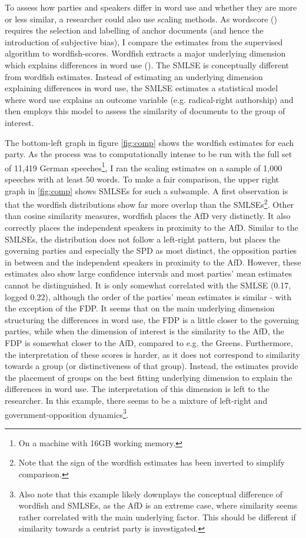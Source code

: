 \documentclass{article}
\begin{document}
To assess how parties and speakers differ in word use and whether they are more or less similar, a researcher could also use scaling methods. As wordscore (\cite{Laver2003}) requires the selection and labelling of anchor documents (and hence the introduction of subjective bias), I compare the estimates from the supervised algorithm to wordfish-scores. Wordfish extracts a major underlying dimension which explains differences in word use (\cite{Slapin2008}). The SMLSE is conceptually different from wordfish estimates. Instead of estimating an underlying dimension explaining differences in word use, the SMLSE estimates a statistical model where word use explains an outcome variable (e.g. radical-right authorship) and then employs this model to assess the similarity of documents to the group of interest. \par

The bottom-left graph in figure \ref{fig:comp} shows the wordfish estimates for each party. As the process was to computationally intense to be run with the full set of 11,419 German speeches\footnote{On a machine with 16GB working memory.}, I ran the scaling estimates on a sample of 1,000 speeches with at least 50 words. To make a fair comparison, the upper right graph in \ref{fig:comp} shows SMLSEs for such a subsample. A first observation is that the wordfish distributions show far more overlap than the SMLSEs\footnote{Note that the sign of the wordfish estimates has been inverted to simplify comparison.}. Other than cosine similarity measures, wordfish places the AfD very distinctly. It also correctly places the independent speakers in proximity to the AfD. Similar to the SMLSEs, the distribution does not follow a left-right pattern, but places the governing parties and especially the SPD as most distinct, the opposition parties in between and the independent speakers in proximity to the AfD. However, these estimates also show large confidence intervals and most parties' mean estimates cannot be distinguished. It is only somewhat correlated with the SMLSE (0.17, logged 0.22), although the order of the parties' mean estimates is similar - with the exception of the FDP. It seems that on the main underlying dimension structuring the differences in word use, the FDP is a little closer to the governing parties, while when the dimension of interest is the similarity to the AfD, the FDP is somewhat closer to the AfD, compared to e.g. the Greens. Furthermore, the interpretation of these scores is harder, as it does not correspond to similarity towards a group (or distinctiveness of that group). Instead, the estimates provide the placement of groups on the best fitting underlying dimension to explain the differences in word use. The interpretation of this dimension is left to the researcher. In this example, there seems to be a mixture of left-right and government-opposition dynamics\footnote{Also note that this example likely downplays the conceptual difference of wordfish and SMLSEs, as the AfD is an extreme case, where similarity seems rather correlated with the main underlying factor. This should be different if similarity towards a centrist party is investigated.}.\par
\end{document}
